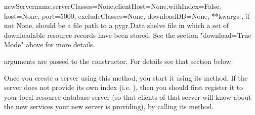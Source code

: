 \documentclass{howto}
\begin{document}
\begin{funcdesc}{newServer}{name,serverClasses=None,clientHost=None,withIndex=False, host=None, port=5000, excludeClasses=None, downloadDB=None, **kwargs}
  , if not None, should be a file path to a pygr.Data
  shelve file in which a set of downloadable resource records have been
  stored.  See the section "download=True Mode" above for more details.

   arguments are passed to the  constructor.
  For details see that section below.

  Once you create a server using this method, you start it using its
   method.  If the server does not provide its
  own index (i.e. ), then you should first register
  it to your local resource database server (so that clients of that server
  will know about the new services your new server is providing), by
  calling its  method.
\end{funcdesc}
\end{document}
